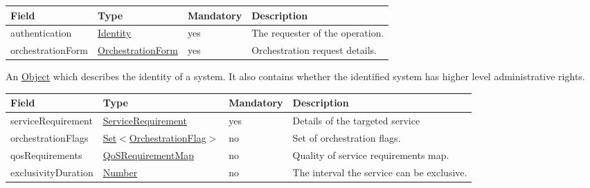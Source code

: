 \documentclass[a4paper]{arrowhead}
\newcommand{\pref}[1]{{\textcolor{ArrowheadGrey}{\hyperref[sec:model:primitives:#1]{#1}}}}
\begin{document}
{}
 
\begin{table}[ht!]
\begin{tabularx}{\textwidth}{| p{3.25cm} | p{3.5cm} | p{2cm} | X |} \hline
\rowcolor{gray!33} Field & Type & Mandatory & Description \\ \hline
authentication & \hyperref[sec:model:Identity]{Identity} & yes & The requester of the operation. \\ \hline
orchestrationForm & \hyperref[sec:model:OrchestrationForm]{OrchestrationForm} & yes & Orchestration request details. \\ \hline
\end{tabularx}
\end{table}


An \pref{Object} which describes the identity of a system. It also contains whether the identified system has higher level administrative rights.


\begin{table}[ht!]
\begin{tabularx}{\textwidth}{| p{3.25cm} | p{3.8cm} | p{2cm} | X |} \hline
\rowcolor{gray!33} Field & Type & Mandatory & Description \\ \hline
serviceRequirement & \hyperref[sec:model:ServiceRequirement]{ServiceRequirement} & yes & Details of the targeted service \\ \hline
orchestrationFlags & \pref{Set}$<$\hyperref[sec:model:OrchestrationFlag]{OrchestrationFlag}$>$ & no & Set of orchestration flags. \\ \hline
qosRequirements & \hyperref[sec:model:QoSRequirementMap]{QoSRequirementMap} & no & Quality of service requirements map. \\ \hline
exclusivityDuration & \pref{Number} & no & The interval the service can be exclusive.  \\ \hline
\end{tabularx}
\end{table}

\clearpage

\end{document}
